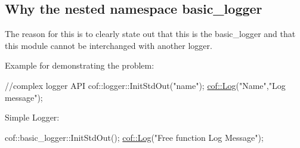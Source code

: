 \subsection*{Why the nested namespace {\ttfamily basic\+\_\+logger}}

The reason for this is to clearly state out that this is the {\ttfamily basic\+\_\+logger} and that this module cannot be interchanged with another logger.

Example for demonstrating the problem\+:


\begin{DoxyCode}
\textcolor{comment}{//complex logger API}
cof::logger::InitStdOut(\textcolor{stringliteral}{"name"});
\hyperlink{_logging_function_8h_a1f56bcf4dd7901f39b3386261c75d4a5}{cof::Log}(\textcolor{stringliteral}{"Name"},\textcolor{stringliteral}{"Log message"});
\end{DoxyCode}


Simple Logger\+:


\begin{DoxyCode}
cof::basic\_logger::InitStdOut();    
\hyperlink{_logging_function_8h_a1f56bcf4dd7901f39b3386261c75d4a5}{cof::Log}(\textcolor{stringliteral}{"Free function Log Message"});
\end{DoxyCode}
 